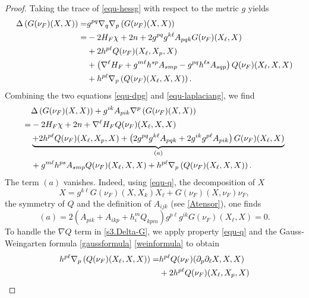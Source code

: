\documentclass[10pt,a4paper]{amsart}
\numberwithin{equation}{section}
\begin{document}
\begin{proof}
		Taking the trace of \eqref{equ-hessg} with respect to the metric $g$ yields
		\begin{align}
			\Delta\left( G(\nu_F)(X,X) \right) 
			=& g^{pq}\nabla_q\nabla_p\left( G(\nu_F)(X,X) \right) \notag\\
			=& -2 H_F \chi + 2n + 2g^{pq}g^{k\ell} A_{pqk}G(\nu_F)(X_{\ell},X) \nonumber\\
			&+ 2h^{p\ell}Q(\nu_F)(X_{\ell},X_p,X)\notag\\
			&+\left( \nabla^{\ell}H_F + g^{m\ell}h^{sp} A_{smp} - g^{pq}h^{\ell s}A_{sqp} \right)Q(\nu_F)(X_{\ell},X,X) \notag\\
			&+h^{p\ell}\nabla_p\left( Q(\nu_F)(X_{\ell},X,X) \right). \label{equ-laplaciang}
		\end{align}
		Combining the two equations \eqref{equ-dpg} and \eqref{equ-laplaciang}, we find
		\begin{align}
			&\Delta\left( G(\nu_F)(X,X) \right) + g^{ik}A_{pik}\nabla^p\left( G(\nu_F)(X,X) \right) \notag\\
			=& -2H_F \chi + 2n + \nabla^{\ell}H_F Q(\nu_F)(X_{\ell},X,X) \nonumber\\
			& \underbrace{+ 2 h^{p\ell}Q(\nu_F)(X_{\ell},X_p,X) +\left( 2g^{pq}g^{k\ell}A_{pqk} + 2g^{ik}g^{p\ell}A_{pik} \right)G(\nu_F)(X_{\ell},X) }_{(a)} \nonumber\\
			& + g^{m\ell}h^{ps}A_{smp} Q(\nu_F)(X_{\ell},X,X) + h^{p\ell}\nabla_p\left( Q(\nu_F)(X_{\ell},X,X) \right). \label{s3.Delta-G}
		\end{align}
		The term $(a)$ vanishes. Indeed, using \eqref{equ-q}, the decomposition of $X$
		\begin{equation*}
			X=g^{k\ell}G(\nu_F)(X,X_k)X_{\ell}+G(\nu_F)(X,\nu_F)\nu_F,
		\end{equation*}
		the symmetry of $Q$ and the definition of $A_{ijk}$ (see \eqref{Atensor}), one finds
		\begin{equation}\label{s3.a-vanish}
			(a) = 2\left( A_{pik} + A_{ikp} + h_{i}^mQ_{kpm} \right) g^{p\ell}g^{ik}G(\nu_F)(X_{\ell},X) =0.
		\end{equation}
	To handle the $\nabla Q$ term in \eqref{s3.Delta-G}, we apply property \eqref{equ-q} and the Gauss-Weingarten formula \eqref{gaussformula}  \eqref{weinformula} to obtain
		\begin{align}
			h^{p\ell}\nabla_p\left( Q(\nu_F)(X_{\ell},X,X) \right) =& h^{p\ell}Q(\nu_F)(\partial_p\partial_{\ell} X,X,X) \notag\\
			&+ 2h^{p\ell}Q(\nu_F)(X_{\ell},X_p,X) \notag\\

\end{align}
\end{proof}
\end{document}
